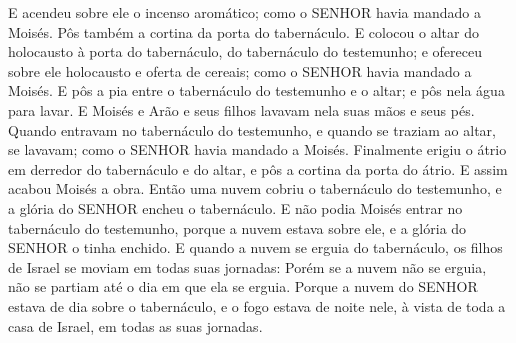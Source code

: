{  E acendeu sobre ele o incenso aromático; como o SENHOR havia mandado a Moisés.
  Pôs também a cortina da porta do tabernáculo.
  E colocou o altar do holocausto à porta do tabernáculo, do tabernáculo do testemunho; e ofereceu sobre ele holocausto e oferta de cereais; como o SENHOR havia mandado a Moisés.
  E pôs a pia entre o tabernáculo do testemunho e o altar; e pôs nela água para lavar.
  E Moisés e Arão e seus filhos lavavam nela suas mãos e seus pés.
  Quando entravam no tabernáculo do testemunho, e quando se traziam ao altar, se lavavam; como o SENHOR havia mandado a Moisés.
  Finalmente erigiu o átrio em derredor do tabernáculo e do altar, e pôs a cortina da porta do átrio. E assim acabou Moisés a obra.
  Então uma nuvem cobriu o tabernáculo do testemunho, e a glória do SENHOR encheu o tabernáculo.
  E não podia Moisés entrar no tabernáculo do testemunho, porque a nuvem estava sobre ele, e a glória do SENHOR o tinha enchido.
  E quando a nuvem se erguia do tabernáculo, os filhos de Israel se moviam em todas suas jornadas:
  Porém se a nuvem não se erguia, não se partiam até o dia em que ela se erguia.
  Porque a nuvem do SENHOR estava de dia sobre o tabernáculo, e o fogo estava de noite nele, à vista de toda a casa de Israel, em todas as suas jornadas.\par }

